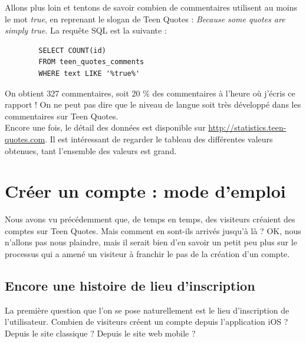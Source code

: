 \documentclass{report}
\begin{document}
	Allons plus loin et tentons de savoir combien de commentaires utilisent au moins le mot \textit{true}, en reprenant le slogan de Teen Quotes : \textit{Because some quotes are simply true}. La requête SQL est la suivante :
	\begin{lstlisting}
		SELECT COUNT(id) 
		FROM teen_quotes_comments
		WHERE text LIKE '%true%'
	\end{lstlisting}
	On obtient 327 commentaires, soit 20 \% des commentaires à l'heure où j'écris ce rapport ! On ne peut pas dire que le niveau de langue soit très développé dans les commentaires sur Teen Quotes.\\
		
	Encore une fois, le détail des données est disponible sur \url{http://statistics.teen-quotes.com}. Il est intéressant de regarder le tableau des différentes valeurs obtenues, tant l'ensemble des valeurs est grand.

	\chapter{Créer un compte : mode d'emploi}
	Nous avons vu précédemment que, de temps en temps, des visiteurs créaient des comptes sur Teen Quotes. Mais comment en sont-ils arrivés jusqu'à là ? OK, nous n'allons pas nous plaindre, mais il serait bien d'en savoir un petit peu plus sur le processus qui a amené un visiteur à franchir le pas de la création d'un compte.

	\section{Encore une histoire de lieu d'inscription}
	La première question que l'on se pose naturellement est le lieu d'inscription de l'utilisateur. Combien de visiteurs créent un compte depuis l'application iOS ? Depuis le site classique ? Depuis le site web mobile ?\\
\end{document}
